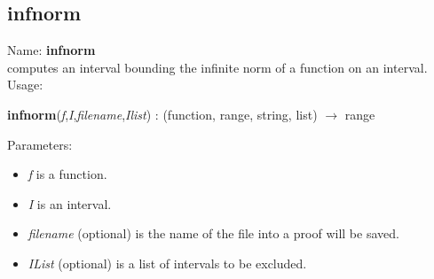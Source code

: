 \subsection{ infnorm }
\noindent Name: \textbf{infnorm}\\
computes an interval bounding the infinite norm of a function on an interval.\\

\noindent Usage: 
\begin{center}
\textbf{infnorm}(\emph{f},\emph{I},\emph{filename},\emph{Ilist}) : (\textsf{function}, \textsf{range}, \textsf{string}, \textsf{list}) $\rightarrow$ \textsf{range}\\
\end{center}
Parameters: 
\begin{itemize}
\item \emph{f} is a function.
\item \emph{I} is an interval.
\item \emph{filename} (optional) is the name of the file into a proof will be saved.
\item \emph{IList} (optional) is a list of intervals to be excluded.
\end{itemize}
